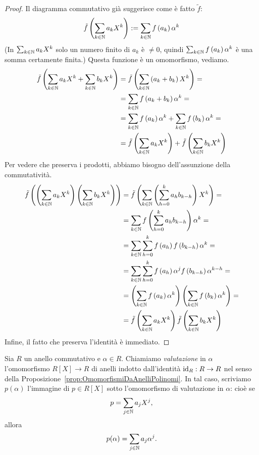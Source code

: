 \begin{proof}
Il diagramma commutativo già suggerisce come è fatto $\tilde f$:
\[\tilde f \left(\sum_{k \in \mathbb{N}} a_kX^k\right) := \sum_{k \in \mathbb{N}} f\left(a_k\right)\alpha^k\]
(In $\sum_{k \in \mathbb{N}} a_k X^k$ solo un numero finito di $a_k$ è $\ne 0$, quindi $\sum_{k \in \mathbb{N}} f\left(a_k\right) \alpha^k$ è una somma certamente finita.) Questa funzione è un omomorfismo, vediamo.
\begin{align*}
\tilde f \left(\sum_{k \in \mathbb{N}} a_kX^k + \sum_{k \in \mathbb{N}} b_kX^k\right) &= \tilde f \left(\sum_{k \in \mathbb{N}} \left(a_k+b_k\right)X^k\right) =\\
&= \sum_{k \in \mathbb{N}} f\left(a_k+b_k\right)\alpha^k = \\
&= \sum_{k \in \mathbb{N}} f\left(a_k\right)\alpha^k + \sum_{k \in \mathbb{N}} f\left(b_k\right)\alpha^k = \\
&= \tilde f \left(\sum_{k \in \mathbb{N}} a_kX^k\right) + \tilde f \left(\sum_{k \in \mathbb{N}} b_kX^k\right)
\end{align*}
Per vedere che preserva i prodotti, abbiamo bisogno dell'assunzione della commutatività.
\begin{align*}
\tilde f \left(\left(\sum_{k \in \mathbb{N}} a_kX^k\right) \left(\sum_{k \in \mathbb{N}} b_kX^k \right)\right) &= \tilde f \left(\sum_{k \in \mathbb{N}} \left(\sum_{h=0}^k a_hb_{k-h}\right)X^k\right) = \\
&= \sum_{k \in \mathbb{N}} f\left(\sum_{h=0}^k a_hb_{k-h}\right)\alpha^k = \\
&= \sum_{k \in \mathbb{N}} \sum_{h=0}^k f\left(a_h\right) f\left(b_{k-h}\right) \alpha^k = \\
&= \sum_{k \in \mathbb{N}} \sum_{h=0}^k f\left(a_h\right)\alpha^j f\left(b_{k-h}\right)\alpha^{k-h} = \\
&= \left(\sum_{k \in \mathbb{N}} f\left(a_k\right)\alpha^k\right) \left(\sum_{k \in \mathbb{N}} f\left(b_k\right)\alpha^k\right) = \\
&= \tilde f \left(\sum_{k \in \mathbb{N}} a_kX^k\right) \tilde f \left(\sum_{k \in \mathbb{N}} b_kX^k\right)
\end{align*}
Infine, il fatto che preserva l'identità è immediato.
\end{proof}

\begin{defi}\label{prop:ValutazionePolinomi}
Sia $R$ un anello commutativo e $\alpha \in R$. Chiamiamo {\em valutazione} in $\alpha$ l'omomorfismo $R[X] \to R$ di anelli indotto dall'identità $\mathrm{id}_R : R \to R$ nel senso della Proposizione~\ref{prop:OmomorfismiDaAnelliPolinomi}. In tal caso, scriviamo $p(\alpha)$ l'immagine di $p \in R[X]$ sotto l'omomorfismo di valutazione in $\alpha$: cioè se 
\[p = \sum_{j \in \mathbb{N}} a_j X^j ,\]
allora
\[p(\alpha) = \sum_{j \in \mathbb{N}} a_j \alpha^j .\]
\end{defi}

